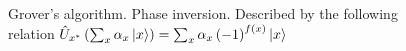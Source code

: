 \begin{figure}
\centering



\caption{Grover's algorithm. Phase inversion. Described by the following relation  
$\hat{U}_{x^{\ast}}\left(\sum_x \alpha_x
\ket{x}\right) =  
\sum_x \alpha_x \left(-1\right)^{f\left(x\right)}\ket{x}$}
\label{figQuantCompGroverInv}
\end{figure}